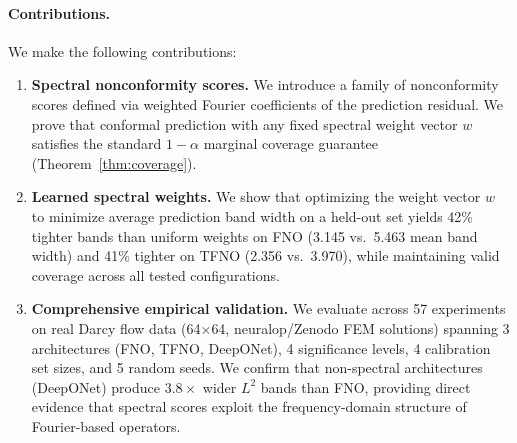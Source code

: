 \paragraph{Contributions.} We make the following contributions:
\begin{enumerate}[leftmargin=*,itemsep=2pt,topsep=2pt]
  \item \textbf{Spectral nonconformity scores.} We introduce a family of
    nonconformity scores defined via weighted Fourier coefficients of the
    prediction residual. We prove that conformal prediction with any fixed
    spectral weight vector $w$ satisfies the standard $1-\alpha$ marginal
    coverage guarantee (Theorem~\ref{thm:coverage}).

  \item \textbf{Learned spectral weights.} We show that optimizing the weight
    vector $w$ to minimize average prediction band width on a held-out set
    yields 42\% tighter bands than uniform weights on FNO (3.145 vs.\ 5.463
    mean band width) and 41\% tighter on TFNO (2.356 vs.\ 3.970), while
    maintaining valid coverage across all tested configurations.

  \item \textbf{Comprehensive empirical validation.} We evaluate across 57
    experiments on real Darcy flow data (64$\times$64, neuralop/Zenodo FEM
    solutions) spanning 3 architectures (FNO, TFNO, DeepONet), 4 significance
    levels, 4 calibration set sizes, and 5 random seeds. We confirm that
    non-spectral architectures (DeepONet) produce $3.8\times$ wider $L^2$ bands
    than FNO, providing direct evidence that spectral scores exploit the
    frequency-domain structure of Fourier-based operators.
\end{enumerate}
